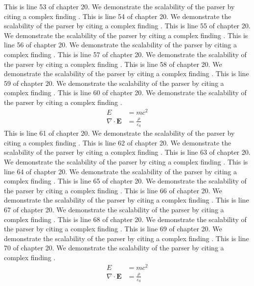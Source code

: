 This is line 53 of chapter 20. We demonstrate the scalability of the parser by citing a complex finding \cite{ref20_53}.
This is line 54 of chapter 20. We demonstrate the scalability of the parser by citing a complex finding \cite{ref20_54}.
This is line 55 of chapter 20. We demonstrate the scalability of the parser by citing a complex finding \cite{ref20_55}.
This is line 56 of chapter 20. We demonstrate the scalability of the parser by citing a complex finding \cite{ref20_56}.
This is line 57 of chapter 20. We demonstrate the scalability of the parser by citing a complex finding \cite{ref20_57}.
This is line 58 of chapter 20. We demonstrate the scalability of the parser by citing a complex finding \cite{ref20_58}.
This is line 59 of chapter 20. We demonstrate the scalability of the parser by citing a complex finding \cite{ref20_59}.
This is line 60 of chapter 20. We demonstrate the scalability of the parser by citing a complex finding \cite{ref20_60}.
\begin{align*}
  E &= mc^2 \\
  \nabla \cdot \mathbf{E} &= \frac{\rho}{\varepsilon_0}
\end{align*}
This is line 61 of chapter 20. We demonstrate the scalability of the parser by citing a complex finding \cite{ref20_61}.
This is line 62 of chapter 20. We demonstrate the scalability of the parser by citing a complex finding \cite{ref20_62}.
This is line 63 of chapter 20. We demonstrate the scalability of the parser by citing a complex finding \cite{ref20_63}.
This is line 64 of chapter 20. We demonstrate the scalability of the parser by citing a complex finding \cite{ref20_64}.
This is line 65 of chapter 20. We demonstrate the scalability of the parser by citing a complex finding \cite{ref20_65}.
This is line 66 of chapter 20. We demonstrate the scalability of the parser by citing a complex finding \cite{ref20_66}.
This is line 67 of chapter 20. We demonstrate the scalability of the parser by citing a complex finding \cite{ref20_67}.
This is line 68 of chapter 20. We demonstrate the scalability of the parser by citing a complex finding \cite{ref20_68}.
This is line 69 of chapter 20. We demonstrate the scalability of the parser by citing a complex finding \cite{ref20_69}.
This is line 70 of chapter 20. We demonstrate the scalability of the parser by citing a complex finding \cite{ref20_70}.
\begin{align*}
  E &= mc^2 \\
  \nabla \cdot \mathbf{E} &= \frac{\rho}{\varepsilon_0}
\end{align*}
